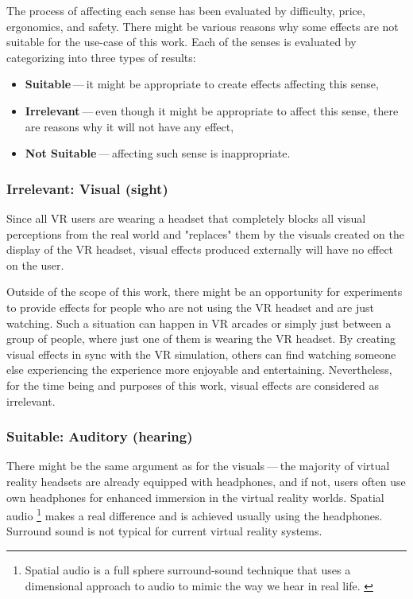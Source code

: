 The process of affecting each sense has been evaluated by difficulty,
price, ergonomics, and safety. There might be various reasons why some
effects are not suitable for the use-case of this work.
Each of the senses is evaluated by categorizing into three types of results:


\begin{itemize}

\item \textbf{Suitable} — it might be appropriate to create effects affecting this sense,

\item \textbf{Irrelevant} — even though it might be appropriate to affect this sense,
there are reasons why it will not have any effect,

\item \textbf{Not Suitable} — affecting such sense is inappropriate.

\end{itemize}


\hypertarget{x-irrelevant:-visual-(sight)}{\subsubsection*{Irrelevant: Visual (sight)}}
Since all VR users are wearing a headset that completely blocks
all visual perceptions from the real world and "replaces" them by the visuals
created on the display of the VR headset, visual effects produced externally
will have no effect on the user.


Outside of the scope of this work, there might be an opportunity for experiments
to provide effects for people who are not using the VR headset and are
just watching. Such a situation can happen in VR arcades or simply
just between a group of people, where just one of them is wearing the VR headset.
By creating visual effects in sync with the VR
simulation, others can find watching someone else experiencing the experience
more enjoyable and entertaining. Nevertheless, for the time being and purposes
of this work, visual effects are considered as irrelevant.


\hypertarget{x-suitable:-auditory-(hearing)}{\subsubsection*{Suitable: Auditory (hearing)}}
There might be the same argument as for the visuals — the majority of virtual reality headsets are already equipped with
headphones, and if not, users often use own headphones for
enhanced immersion in the virtual reality worlds.
Spatial audio
\footnote{Spatial audio is a full sphere surround-sound technique that uses a dimensional approach to audio to mimic the way we hear in real life. \hyperlink{spaudio}{}}
makes a real difference and is achieved usually using the headphones.
Surround sound is not typical for current virtual reality systems.


